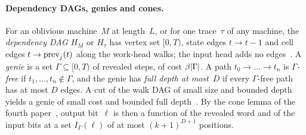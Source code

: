 \paragraph{Dependency DAGs, genies and cones.} For an oblivious machine~$M$ at length~$L$, or for one trace~$\tau$ of
any machine, the \emph{dependency DAG} $H_M$ or $H_\tau$ has vertex set $[0,T)$, state edges $t\to t-1$ and cell edges
$t\to\mathrm{prev}_j(t)$ along the work-head walks; the input head adds no edges~\cite[Section~2.4]{BoundedNesting2026}. A
\emph{genie} is a set $\Gamma\subseteq[0,T)$ of revealed steps, of cost $\beta\lvert \Gamma \rvert$. A path $t_0\to\dots\to t_n$
is \emph{$\Gamma$-free} if $t_1,\dots,t_n\notin\Gamma$, and the genie has \emph{full depth at most~$D$} if every
$\Gamma$-free path has at most $D$ edges. A cut of the walk DAG of small size and bounded depth yields a genie of small
cost and bounded full depth~\cite[Lemma~2.6]{BoundedNesting2026}. By the cone lemma of the fourth
paper~\cite[Lemma~4.4 and Corollary~4.5]{FourthPaper2026}, output bit~$\ell$ is then a function of the revealed word and
of the input bits at a set $I_\Gamma(\ell)$ of at most $(k+1)^{D+1}$ positions.

